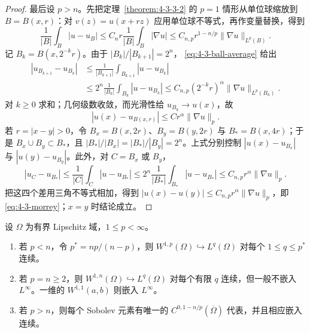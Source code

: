 \begin{proof}
最后设 $p>n$。先把定理~\ref{theorem:4-3-3-2} 的 $p=1$ 情形从单位球缩放到
$B=B(x,r)$：对 $v(z)=u(x+rz)$ 应用单位球不等式，再作变量替换，得到
\[
 \frac1{|B|}\int_B|u-u_B|
 \leq C_nr\frac1{|B|}\int_B|\nabla u|
 \leq C_{n,p}r^{1-n/p}\|\nabla u\|_{L^p(B)}.
 \tag{4.3.21}\label{eq:4-3-ball-average}
\]
记 $B_k=B(x,2^{-k}r)$。由于 $|B_k|/|B_{k+1}|=2^n$，
\eqref{eq:4-3-ball-average} 给出
\[
 \begin{aligned}
 |u_{B_{k+1}}-u_{B_k}|
 &\le \frac1{|B_{k+1}|}\int_{B_{k+1}}|u-u_{B_k}|\\
 &\le 2^n\frac1{|B_k|}\int_{B_k}|u-u_{B_k}|
 \le C_{n,p}(2^{-k}r)^\alpha\|\nabla u\|_{L^p(B_k)}.
 \end{aligned}
\]
对 $k\geq0$ 求和；几何级数收敛，而光滑性给
$u_{B_k}\to u(x)$，故
\[
 |u(x)-u_{B(x,r)}|\leq C r^\alpha\|\nabla u\|_p.
\]
若 $r=|x-y|>0$，令
$B_x=B(x,2r)$、$B_y=B(y,2r)$ 与 $B_*=B(x,4r)$；于是
$B_x\cup B_y\subset B_*$，且 $|B_*|/|B_x|=|B_*|/|B_y|=2^n$。上式分别控制
$|u(x)-u_{B_x}|$ 与 $|u(y)-u_{B_y}|$。此外，对 $C=B_x$ 或 $B_y$，
\[
 |u_C-u_{B_*}|
 \le\frac1{|C|}\int_C|u-u_{B_*}|
 \le2^n\frac1{|B_*|}\int_{B_*}|u-u_{B_*}|
 \le C_{n,p}r^\alpha\|\nabla u\|_p.
\]
把这四个差用三角不等式相加，得到
$|u(x)-u(y)|\leq C_{n,p}r^\alpha\|\nabla u\|_p$，即
\eqref{eq:4-3-morrey}；$x=y$ 时结论成立。
\end{proof}

\begin{proposition}\label{proposition:4-3-3-4}
设 $\Omega$ 为有界 Lipschitz 域，$1\leq p<\infty$。
\begin{enumerate}
  \item 若 $p<n$，令 $p^*=np/(n-p)$，则
  $W^{1,p}(\Omega)\hookrightarrow L^q(\Omega)$ 对每个 $1\leq q\leq p^*$ 连续。
  \item 若 $p=n\geq2$，则 $W^{1,n}(\Omega)\hookrightarrow L^q(\Omega)$ 对每个有限
  $q$ 连续，但一般不嵌入 $L^\infty$。一维的 $W^{1,1}(a,b)$ 则嵌入 $L^\infty$。
  \item 若 $p>n$，则每个 Sobolev 元素有唯一的
  $C^{0,1-n/p}(\overline\Omega)$ 代表，并且相应嵌入连续。
\end{enumerate}
\end{proposition}

